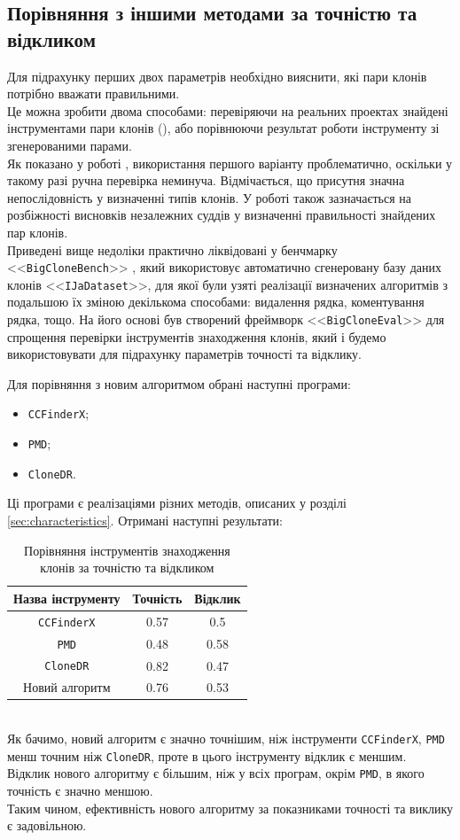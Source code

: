 \documentclass[a4paper, 14pt]{article}
\begin{document}
\subsection{Порівняння з іншими методами за точністю та відкликом}
\par Для підрахунку перших двох параметрів необхідно вияснити, які пари клонів потрібно вважати правильними. \\ 
Це можна зробити двома способами: перевіряючи на реальних проектах знайдені інструментами пари клонів (\cite{Bellon07}), або порівнюючи результат роботи інструменту зі згенерованими парами. \\ 
Як показано у роботі \cite{Roy18}, використання першого варіанту проблематично, оскільки у такому разі ручна перевірка неминуча. Відмічається, що присутня значна непослідовність у визначенні типів клонів. У роботі \cite{Charpentier15} також зазначається на розбіжності висновків незалежних суддів у визначенні правильності знайдених пар клонів. \\
Приведені вище недоліки практично ліквідовані у бенчмарку <<\verb|BigCloneBench|>> \cite{Svajlenko14}, який використовує автоматично сгенеровану базу даних клонів <<\verb|IJaDataset|>>, для якої були узяті реалізації визначених алгоритмів з подальшою їх зміною декількома способами: видалення рядка, коментування рядка, тощо. На його основі був створений фреймворк <<\verb|BigCloneEval|>> для спрощення перевірки інструментів знаходження клонів, який і будемо використовувати для підрахунку параметрів точності та відклику. \par
Для порівняння з новим алгоритмом обрані наступні програми:
\begin{itemize}
\item \verb|CCFinderX|;
\item \verb|PMD|;
\item \verb|CloneDR|.
\end{itemize}
Ці програми є реалізаціями різних методів, описаних у розділі \ref{sec:characteristics}.
Отримані наступні результати: \\
\begin{table}[ht]
\centering
 \begin{tabular}{| c | c | c |} 
 \hline
 Назва інструменту & Точність & Відклик \\ [0.5ex] 
 \hline
 \verb|CCFinderX| & 0.57 & 0.5 \\ 
 \hline
 \verb|PMD| & 0.48 & 0.58 \\
 \hline
 \verb|CloneDR| & 0.82 & 0.47 \\
 \hline
 Новий алгоритм & 0.76 & 0.53 \\ [1ex]
 \hline
\end{tabular} 
\caption{\centering Порівняння інструментів знаходження клонів за точністю та відкликом}
\end{table} \\
Як бачимо, новий алгоритм є значно точнішим, ніж інструменти \verb|CCFinderX|, \verb|PMD| менш точним ніж \verb|CloneDR|, проте в цього інструменту відклик є меншим. \\
Відклик нового алгоритму є більшим, ніж у всіх програм, окрім \verb|PMD|, в якого точність є значно меншою. \\
Таким чином, ефективність нового алгоритму за показниками точності та виклику є задовільною.
\end{document}
